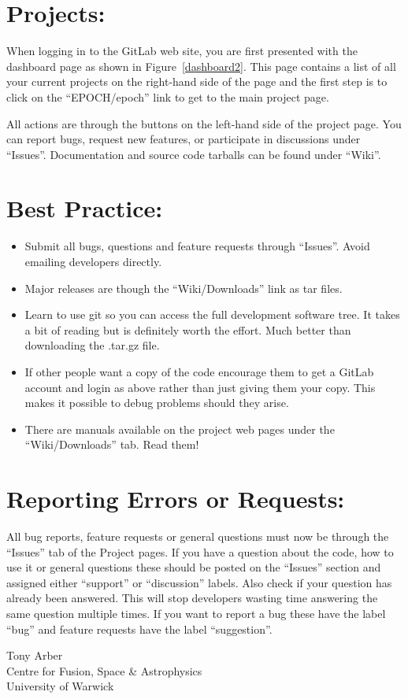

\section*{Projects:}
When logging in to the GitLab web site, you are first presented with the
dashboard page as shown in Figure~\ref{dashboard2}. This page contains a list
of all your current projects on the right-hand side of the page and the first
step is to click on the ``EPOCH/epoch'' link to get to the main {\EPOCH} project
page.

All actions are through the buttons on the left-hand side of the project page.
You can report bugs, request new features, or participate in discussions
under ``Issues''. Documentation and source code tarballs can be found under
``Wiki''.

\section*{Best Practice:}
\begin{itemize}
\item Submit all bugs, questions and feature requests through ``Issues''. Avoid emailing developers directly.
\item Major releases are though the ``Wiki/Downloads'' link as tar files.
\item Learn to use git so you can access the full development software tree. It takes a bit of reading but is
definitely worth the effort. Much better than downloading the .tar.gz file.
\item If other people want a copy of the code encourage them to get a GitLab account and login as above
rather than just giving them your copy. This makes it possible to debug problems should they arise.
\item There are manuals available on the project web pages under the ``Wiki/Downloads'' tab. Read them!
\end{itemize}

\section*{Reporting Errors or Requests:}
All bug reports, feature requests or general questions must now be through
the ``Issues'' tab of the Project pages. If you have a question about the code,
how to use it or general questions these should be posted on the ``Issues''
section and assigned either ``support'' or ``discussion'' labels. Also check
if your question has already been answered. This will stop developers wasting
time answering the same question multiple times. If you want to report a bug
these have the label ``bug'' and feature requests have the label ``suggestion''.

\vspace{10mm}
\noindent Tony Arber\\
Centre for Fusion, Space \& Astrophysics\\
University of Warwick

%
